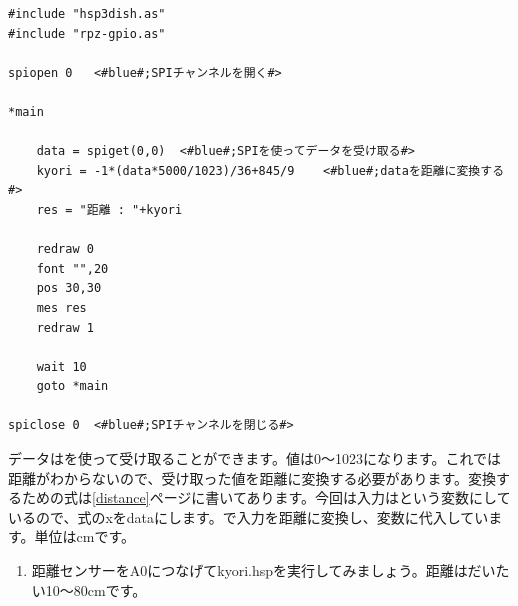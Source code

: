 \begin{lstlisting}[caption=kyori.hsp,label=kyori.hsp]
#include "hsp3dish.as"
#include "rpz-gpio.as"

spiopen 0	<#blue#;SPIチャンネルを開く#>

*main

	data = spiget(0,0)	<#blue#;SPIを使ってデータを受け取る#>
	kyori = -1*(data*5000/1023)/36+845/9	<#blue#;dataを距離に変換する#>
	res = "距離 : "+kyori
	
	redraw 0
	font "",20
	pos 30,30
	mes res
	redraw 1

	wait 10
	goto *main

spiclose 0	<#blue#;SPIチャンネルを閉じる#>
\end{lstlisting}

データはを使って受け取ることができます。値は0～1023になります。これでは距離がわからないので、受け取った値を距離に変換する必要があります。変換するための式は\ref{distance}ページに書いてあります。今回は入力はという変数にしているので、式のxをdataにします。で入力を距離に変換し、変数に代入しています。単位はcmです。\\

\begin{tcolorbox}[title=\useOmetoi]
\begin{enumerate}
\item 距離センサーをA0につなげてkyori.hspを実行してみましょう。距離はだいたい10～80cmです。
\end{enumerate}
\end{tcolorbox}